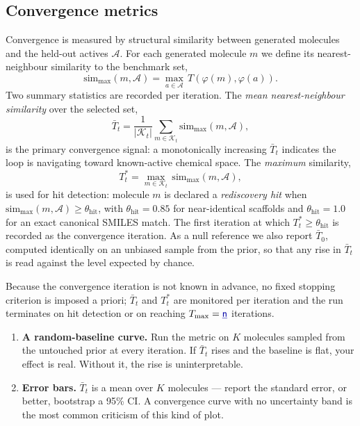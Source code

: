 \documentclass[11pt]{article}
\newcommand{\FILL}[1]{\textcolor{blue!65!black}{\underline{\textsf{#1}}}}
\newcommand{\Actives}{\mathcal{A}}              %
\newcommand{\TopK}{\mathcal{K}}                 %
\newcommand{\fpr}{\varphi}                      %
\newcommand{\Tan}{T}                            %
\newcommand{\simmax}{\mathrm{sim}_{\max}}
\newcommand{\thetahit}{\theta_{\mathrm{hit}}}
\newcommand{\Tbar}{\bar{T}}
\newcommand{\Tstar}{T^{*}}
\newcommand{\Kk}{K}
\begin{document}
\subsection{Convergence metrics}
\label{sec:methods:convergence}

Convergence is measured by structural similarity between generated molecules
and the held-out actives $\Actives$. For each generated molecule $m$ we define
its nearest-neighbour similarity to the benchmark set,
\begin{equation}
  \simmax(m, \Actives)
  = \max_{a \in \Actives}\,
    \Tan\!\left(\fpr(m), \fpr(a)\right).
  \label{eq:simmax}
\end{equation}
Two summary statistics are recorded per iteration. The \emph{mean
nearest-neighbour similarity} over the selected set,
\begin{equation}
  \Tbar_t
  = \frac{1}{|\TopK_t|} \sum_{m \in \TopK_t} \simmax(m, \Actives),
  \label{eq:tbar}
\end{equation}
is the primary convergence signal: a monotonically increasing $\Tbar_t$
indicates the loop is navigating toward known-active chemical space. The
\emph{maximum} similarity,
\begin{equation}
  \Tstar_t = \max_{m \in \TopK_t}\, \simmax(m, \Actives),
  \label{eq:tstar}
\end{equation}
is used for hit detection: molecule $m$ is declared a \emph{rediscovery hit}
when $\simmax(m,\Actives) \ge \thetahit$, with $\thetahit = 0.85$ for
near-identical scaffolds and $\thetahit = 1.0$ for an exact canonical SMILES
match. The first iteration at which $\Tstar_t \ge \thetahit$ is recorded as the
convergence iteration. As a null reference we also report $\Tbar_0$, computed
identically on an unbiased sample from the prior, so that any rise in $\Tbar_t$
is read against the level expected by chance.

Because the convergence iteration is not known in advance, no fixed stopping
criterion is imposed a priori; $\Tbar_t$ and $\Tstar_t$ are monitored per
iteration and the run terminates on hit detection or on reaching
$T_{\max} = \FILL{n}$ iterations.

\begin{guide}
\begin{enumerate}\itemsep0pt
  \item \textbf{A random-baseline curve.} Run the metric on $\Kk$ molecules
        sampled from the untouched prior at every iteration. If $\Tbar_t$ rises
        and the baseline is flat, your effect is real. Without it, the rise is
        uninterpretable.
  \item \textbf{Error bars.} $\Tbar_t$ is a mean over $\Kk$ molecules --- report
        the standard error, or better, bootstrap a 95\% CI. A convergence curve
        with no uncertainty band is the most common criticism of this kind of
        plot.
\end{enumerate}
\end{guide}
\end{document}
